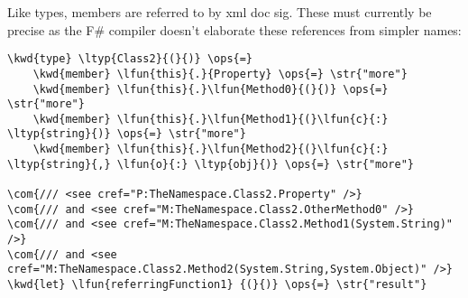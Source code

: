 \documentclass{article}
\newcommand{\com}[1]{\textcolor{officegreen}{#1}}
\newcommand{\kwd}[1]{\textcolor{navy}{#1}}
\newcommand{\ops}[1]{\textcolor{purple}{#1}}
\newcommand{\str}[1]{\textcolor{olive}{#1}}
\begin{document}
Like types, members are referred to by xml doc sig.  These must currently be precise as the F\#
compiler doesn't elaborate these references from simpler names:
\begin{Verbatim}[commandchars=\\\{\}]
\kwd{type} \ltyp{Class2}{(}{)} \ops{=} 
    \kwd{member} \lfun{this}{.}{Property} \ops{=} \str{"more"}
    \kwd{member} \lfun{this}{.}\lfun{Method0}{(}{)} \ops{=} \str{"more"}
    \kwd{member} \lfun{this}{.}\lfun{Method1}{(}\lfun{c}{:} \ltyp{string}{)} \ops{=} \str{"more"}
    \kwd{member} \lfun{this}{.}\lfun{Method2}{(}\lfun{c}{:} \ltyp{string}{,} \lfun{o}{:} \ltyp{obj}{)} \ops{=} \str{"more"}

\com{/// <see cref="P:TheNamespace.Class2.Property" />}
\com{/// and <see cref="M:TheNamespace.Class2.OtherMethod0" />}
\com{/// and <see cref="M:TheNamespace.Class2.Method1(System.String)" />}
\com{/// and <see cref="M:TheNamespace.Class2.Method2(System.String,System.Object)" />}
\kwd{let} \lfun{referringFunction1} {(}{)} \ops{=} \str{"result"}
\end{Verbatim}
\end{document}
